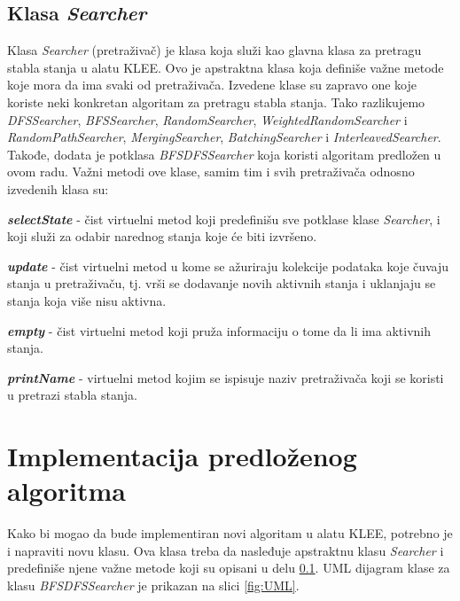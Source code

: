 \documentclass[12pt,oneside]{memoir}
\begin{document}
\subsection{Klasa \textit{Searcher}} \label{pretrazivac}
Klasa \textit{Searcher} (pretraživač) je klasa koja služi kao glavna klasa za pretragu stabla stanja u alatu KLEE. Ovo je apstraktna klasa koja definiše važne metode koje mora da ima svaki od pretraživača. Izvedene klase su zapravo one koje koriste neki konkretan algoritam za pretragu stabla stanja. Tako razlikujemo \textit{DFSSearcher}, \textit{BFSSearcher}, \textit{RandomSearcher}, \textit{WeightedRandomSearcher} i \textit{RandomPathSearcher}, \textit{MergingSearcher}, \textit{BatchingSearcher} i \textit{InterleavedSearcher}. Takođe, dodata je potklasa \textit{BFSDFSSearcher} koja koristi algoritam predložen u ovom radu. Važni metodi ove klase, samim tim i svih pretraživača odnosno izvedenih klasa su:
\begin{description}
    \item \textbf{\textit{selectState}} - čist virtuelni metod koji predefinišu sve potklase klase \textit{Searcher}, i koji služi za odabir narednog stanja koje će biti izvršeno.
    
    \item \textbf{\textit{update}} - čist virtuelni metod u kome se ažuriraju kolekcije podataka koje čuvaju stanja u pretraživaču, tj. vrši se dodavanje novih aktivnih stanja i uklanjaju se stanja koja više nisu aktivna. 
    
    \item \textbf{\textit{empty}} - čist virtuelni metod koji pruža informaciju o tome da li ima aktivnih stanja.
    
    \item \textbf{\textit{printName}} - virtuelni metod kojim se ispisuje naziv pretraživača koji se koristi u pretrazi stabla stanja.
\end{description}

\section{Implementacija predloženog algoritma}
Kako bi mogao da bude implementiran novi algoritam u alatu KLEE, potrebno je i napraviti novu klasu. Ova klasa treba da nasleđuje apstraktnu klasu \textit{Searcher} i predefiniše njene važne metode koji su opisani u delu \ref{pretrazivac}. UML dijagram klase za klasu \textit{BFSDFSSearcher} je prikazan na slici \ref{fig:UML}.
\end{document}
